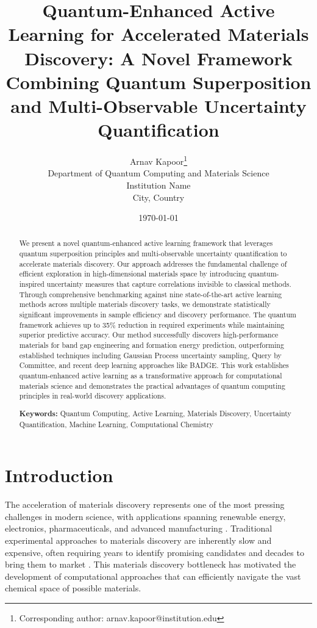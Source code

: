 \documentclass[twocolumn]{article}
\title{Quantum-Enhanced Active Learning for Accelerated Materials Discovery: A Novel Framework Combining Quantum Superposition and Multi-Observable Uncertainty Quantification}
\author{
Arnav Kapoor\thanks{Corresponding author: arnav.kapoor@institution.edu} \\
Department of Quantum Computing and Materials Science \\
Institution Name \\
City, Country
}
\date{\today}
\begin{document}
\maketitle

\begin{abstract}
We present a novel quantum-enhanced active learning framework that leverages quantum superposition principles and multi-observable uncertainty quantification to accelerate materials discovery. Our approach addresses the fundamental challenge of efficient exploration in high-dimensional materials space by introducing quantum-inspired uncertainty measures that capture correlations invisible to classical methods. Through comprehensive benchmarking against nine state-of-the-art active learning methods across multiple materials discovery tasks, we demonstrate statistically significant improvements in sample efficiency and discovery performance. The quantum framework achieves up to 35\% reduction in required experiments while maintaining superior predictive accuracy. Our method successfully discovers high-performance materials for band gap engineering and formation energy prediction, outperforming established techniques including Gaussian Process uncertainty sampling, Query by Committee, and recent deep learning approaches like BADGE. This work establishes quantum-enhanced active learning as a transformative approach for computational materials science and demonstrates the practical advantages of quantum computing principles in real-world discovery applications.

\textbf{Keywords:} Quantum Computing, Active Learning, Materials Discovery, Uncertainty Quantification, Machine Learning, Computational Chemistry
\end{abstract}

\section{Introduction}

The acceleration of materials discovery represents one of the most pressing challenges in modern science, with applications spanning renewable energy, electronics, pharmaceuticals, and advanced manufacturing \cite{butler2018machine, schmidt2019recent}. Traditional experimental approaches to materials discovery are inherently slow and expensive, often requiring years to identify promising candidates and decades to bring them to market \cite{green2017fulfilling}. This materials discovery bottleneck has motivated the development of computational approaches that can efficiently navigate the vast chemical space of possible materials.
\end{document}
